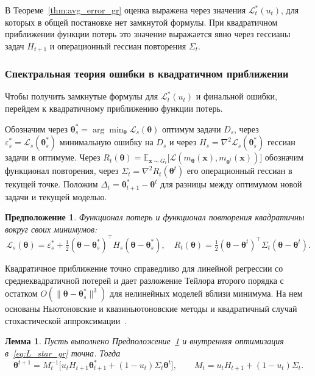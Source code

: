 \documentclass[a4paper,14pt,oneside,openany]{extarticle}
\newtheorem{lemma}{Лемма}
\newtheorem{assumption}{Предположение}
\newcommand{\bx}{\mathbf{x}}
\newcommand{\cL}{\mathcal{L}}
\newcommand{\bbE}{\mathbb{E}}
\newcommand{\btheta}{\boldsymbol{\theta}}
\begin{document}
В Теореме~\ref{thm:avg_error_gr} оценка выражена через значения $\cL^*_t(u_t)$, для которых в общей постановке нет замкнутой формулы. При квадратичном приближении функции потерь это значение выражается явно через гессианы задач $H_{t+1}$ и операционный гессиан повторения $\Sigma_t$.

\subsubsection{Спектральная теория ошибки в квадратичном приближении}

Чтобы получить замкнутые формулы для $\cL^*_t(u_t)$ и финальной ошибки, перейдем к квадратичному приближению функции потерь.

Обозначим через $\btheta^*_s = \arg\min_{\btheta} \cL_s(\btheta)$ оптимум задачи $D_s$, через $\varepsilon^*_s = \cL_s(\btheta^*_s)$ минимальную ошибку на $D_s$ и через $H_s = \nabla^2 \cL_s(\btheta^*_s)$ гессиан задачи в оптимуме. Через $R_t(\btheta) = \bbE_{\bx \sim G_t}\bigl[\cL(m_{\btheta}(\bx), m_{\btheta^t}(\bx))\bigr]$ обозначим функционал повторения, через $\Sigma_t = \nabla^2 R_t(\btheta^t)$ его операционный гессиан в текущей точке. Положим $\Delta_t = \btheta^*_{t+1} - \btheta^t$ для разницы между оптимумом новой задачи и текущей моделью.

\begin{assumption}\label{ass:quad_gr}
    Функционал потерь и функционал повторения квадратичны вокруг своих минимумов:
    \[
        \cL_s(\btheta) = \varepsilon^*_s + \tfrac{1}{2}(\btheta - \btheta^*_s)^\top H_s(\btheta - \btheta^*_s), \quad
        R_t(\btheta) = \tfrac{1}{2}(\btheta - \btheta^t)^\top \Sigma_t(\btheta - \btheta^t).
    \]
\end{assumption}

Квадратичное приближение точно справедливо для линейной регрессии со среднеквадратичной потерей и дает разложение Тейлора второго порядка с остатком $O(\|\btheta - \btheta^*_s\|^3)$ для нелинейных моделей вблизи минимума. На нем основаны Ньютоновские и квазиньютоновские методы и квадратичный случай стохастической аппроксимации~\cite{robbins1951stochastic}.

\begin{lemma}\label{lem:gr_step}
    Пусть выполнено Предположение~\ref{ass:quad_gr} и внутренняя оптимизация в~\eqref{eq:L_star_gr} точна. Тогда
    \begin{equation}
        \btheta^{t+1} = M_t^{-1}\bigl[u_t H_{t+1} \btheta^*_{t+1} + (1 - u_t) \Sigma_t \btheta^t\bigr], \qquad M_t = u_t H_{t+1} + (1 - u_t) \Sigma_t.
        \label{eq:gr_step}
    \end{equation}
\end{lemma}
\end{document}
